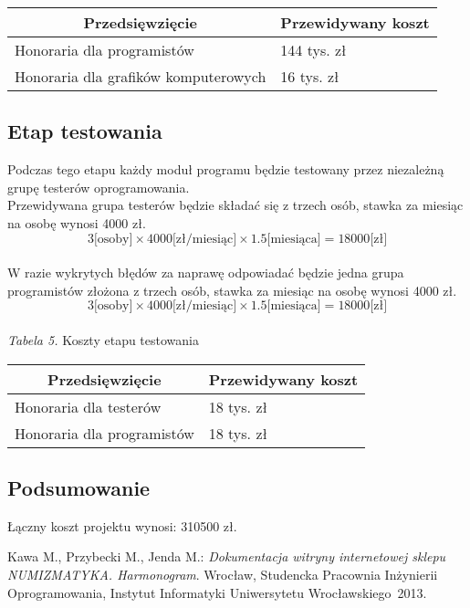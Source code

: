 \documentclass [11pt, a4paper, leqno]	{article}	%
\begin{document}
\begin{center}
	\begin{tabular}{| l | l |}
		\hline
		\multicolumn{1}{|c|}{Przedsięwzięcie} & 
		\multicolumn{1}{|c|}{Przewidywany koszt} \\ \hline \hline
		Honoraria dla programistów & 144 tys. zł \\ \hline
		Honoraria dla grafików komputerowych & 16 tys. zł \\ \hline
	\end{tabular}
\end{center}

\subsection{Etap testowania}
\noindent
Podczas tego etapu każdy moduł programu będzie testowany przez niezależną grupę testerów oprogramowania. \\
Przewidywana grupa testerów będzie składać się z trzech osób, stawka za miesiąc na osobę wynosi 4000 zł. \\
\begin{equation}3 \text{[osoby]} \times 4000 \text{[zł/miesiąc]} \times 1.5 \text{[miesiąca]} = 18000 \text{[zł]} \end{equation} \\
W razie wykrytych błędów za naprawę odpowiadać będzie jedna grupa programistów złożona z trzech osób, stawka za miesiąc na osobę wynosi 4000 zł. \\
\begin{equation}3 \text{[osoby]} \times 4000 \text{[zł/miesiąc]} \times 1.5 \text{[miesiąca]} = 18000 \text{[zł]} \end{equation} \\
\textit{Tabela 5.} Koszty etapu testowania

\begin{center}
	\begin{tabular}{| l | l |}
		\hline
		\multicolumn{1}{|c|}{Przedsięwzięcie} & 
		\multicolumn{1}{|c|}{Przewidywany koszt} \\ \hline \hline
		Honoraria dla testerów & 18 tys. zł \\ \hline
		Honoraria dla programistów & 18 tys. zł \\ \hline
	\end{tabular}
\end{center}

\subsection{Podsumowanie}
\noindent
Łączny koszt projektu wynosi: 310500 zł. \\


\newpage
{}
\begin{thebibliography}{2}
	 Kawa M., Przybecki M., Jenda M.: \emph{Dokumentacja witryny internetowej sklepu NUMIZMATYKA. Harmonogram}. Wrocław, Studencka Pracownia Inżynierii Oprogramowania, Instytut Informatyki Uniwersytetu Wrocławskiego~2013.
\end{thebibliography}
\end{document}
